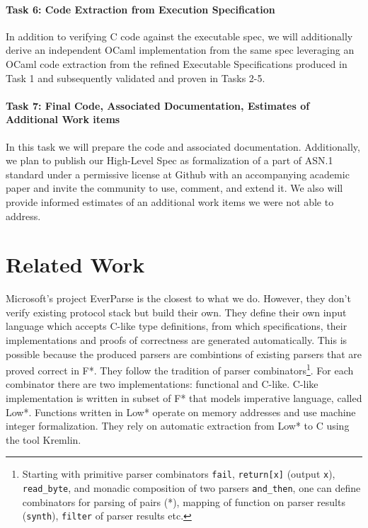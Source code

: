 \documentclass[acmsmall,nonacm]{acmart}
\begin{document}
\paragraph{Task 6: Code Extraction from Execution Specification}
In addition to verifying C code against the executable spec, we will additionally derive an independent OCaml implementation from the same spec leveraging an OCaml code extraction from the refined Executable Specifications produced in Task 1 and subsequently validated and proven in Tasks 2-5. 

\paragraph{Task 7: Final Code, Associated Documentation, Estimates of Additional Work items}
In this task we will prepare the code and associated documentation. Additionally, we plan to publish our High-Level Spec as formalization of a part of ASN.1 standard under a permissive license at Github with an accompanying academic paper and invite the community to use, comment, and extend it. 
We also will provide informed estimates of an additional work items we were not able to address. 

\section{Related Work}

Microsoft's project EverParse \cite{RamananandroDFS19} is the closest
to what we do. However, they don't verify existing protocol stack but
build their own. They define their own input language which accepts
C-like type definitions, from which specifications, their
implementations and proofs of correctness are generated
automatically. This is possible because the produced parsers are
combintions of existing parsers that are proved correct in F*. They
follow the tradition of parser combinators\footnote{Starting with
  primitive parser combinators \texttt{fail}, \texttt{return[x]}
  (output \texttt{x}), \texttt{read\_byte}, and monadic composition of
  two parsers \texttt{and\_then}, one can define combinators for
  parsing of pairs (*), mapping of function on parser results
  (\texttt{synth}), \texttt{filter} of parser results etc.}. For each
combinator there are two implementations: functional and
C-like. C-like implementation is written in subset of F* that models
imperative language, called Low*. Functions written in Low* operate on
memory addresses and use machine integer formalization. They rely on
automatic extraction from Low* to C using the tool Kremlin.
\end{document}
